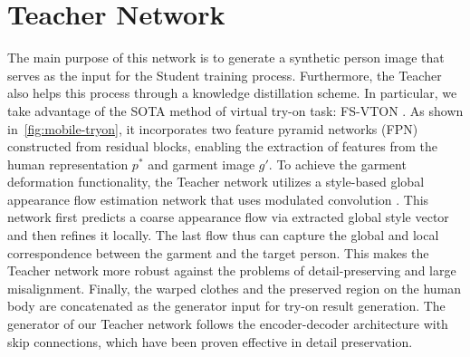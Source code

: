 \section{Teacher Network}

The main purpose of this network is to generate a synthetic person image that serves as the input for the Student training process. Furthermore, the Teacher also helps this process through a knowledge distillation scheme. In particular, we take advantage of the SOTA method of virtual try-on task: FS-VTON \cite{He-CVPR2022-Style}. As shown in~\autoref{fig:mobile-tryon}, it incorporates two feature pyramid networks (FPN)~\cite{Lin-CVPR2017-FPN} constructed from residual blocks, enabling the extraction of features from the human representation $p^*$ and garment image $g'$. To achieve the garment deformation functionality, the Teacher network utilizes a style-based global appearance flow estimation network that uses modulated convolution \cite{Karras-CVPR2019-Style}. This network first predicts a coarse appearance flow via extracted global style vector and then refines it locally. The last flow thus can capture the global and local correspondence between the garment and the target person. This makes the Teacher network more robust against the problems of detail-preserving and large misalignment. Finally, the warped clothes and the preserved region on the human body are concatenated as the generator input for try-on result generation. The generator of our Teacher network follows the encoder-decoder architecture with skip connections, which have been proven effective in detail preservation.

